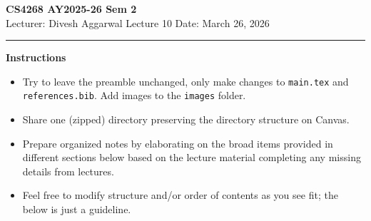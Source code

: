 



% 


\newpage
\noindent
\textbf{CS4268 AY2025-26 Sem 2}
\\
\noindent
Lecturer: Divesh Aggarwal
\hfill
Lecture 10                      %
\hfill
Date: March 26, 2026          %


\noindent
\rule{\textwidth}{1pt}

\medskip


\textbf{Instructions}\\
\begin{itemize}
    \item Try to leave the preamble unchanged, only make changes to \texttt{main.tex} and  \texttt{references.bib}. Add images to the \texttt{images} folder. 
    \item Share one (zipped) directory preserving the directory structure on Canvas. 
    \item Prepare organized notes by elaborating on the broad items provided in different sections below based on the lecture material completing any missing details from lectures.
    \item Feel free to modify structure and/or order of contents as you see fit; the below is just a guideline.
\end{itemize} 



